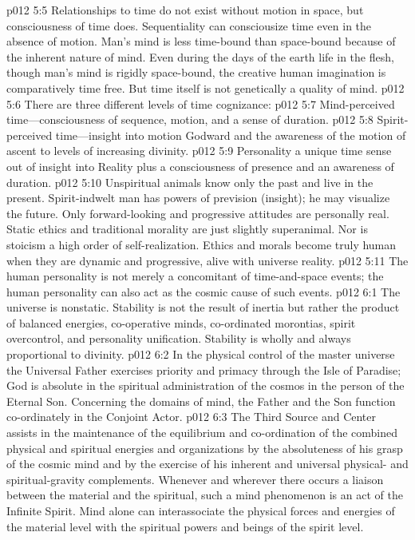 \pc \vs p012 5:5 Relationships to time do not exist without motion in space, but consciousness of time does. Sequentiality can consciousize time even in the absence of motion. Man’s mind is less time\hyp{}bound than space\hyp{}bound because of the inherent nature of mind. Even during the days of the earth life in the flesh, though man’s mind is rigidly space\hyp{}bound, the creative human imagination is comparatively time free. But time itself is not genetically a quality of mind.
\pc \vs p012 5:6 There are three different levels of time cognizance:
\pc \vs p012 5:7 \bibnobreakspace Mind\hyp{}perceived time---consciousness of sequence, motion, and a sense of duration.
\vs p012 5:8 \bibnobreakspace Spirit\hyp{}perceived time---insight into motion Godward and the awareness of the motion of ascent to levels of increasing divinity.
\vs p012 5:9 \bibnobreakspace Personality  a unique time sense out of insight into Reality plus a consciousness of presence and an awareness of duration.
\pc \vs p012 5:10 Unspiritual animals know only the past and live in the present. Spirit\hyp{}indwelt man has powers of prevision (insight); he may visualize the future. Only forward\hyp{}looking and progressive attitudes are personally real. Static ethics and traditional morality are just slightly superanimal. Nor is stoicism a high order of self\hyp{}realization. Ethics and morals become truly human when they are dynamic and progressive, alive with universe reality.
\vs p012 5:11 The human personality is not merely a concomitant of time\hyp{}and\hyp{}space events; the human personality can also act as the cosmic cause of such events.
\vs p012 6:1 The universe is nonstatic. Stability is not the result of inertia but rather the product of balanced energies, co\hyp{}operative minds, co\hyp{}ordinated morontias, spirit overcontrol, and personality unification. Stability is wholly and always proportional to divinity.
\vs p012 6:2 In the physical control of the master universe the Universal Father exercises priority and primacy through the Isle of Paradise; God is absolute in the spiritual administration of the cosmos in the person of the Eternal Son. Concerning the domains of mind, the Father and the Son function co\hyp{}ordinately in the Conjoint Actor.
\vs p012 6:3 The Third Source and Center assists in the maintenance of the equilibrium and co\hyp{}ordination of the combined physical and spiritual energies and organizations by the absoluteness of his grasp of the cosmic mind and by the exercise of his inherent and universal physical\hyp{} and spiritual\hyp{}gravity complements. Whenever and wherever there occurs a liaison between the material and the spiritual, such a mind phenomenon is an act of the Infinite Spirit. Mind alone can interassociate the physical forces and energies of the material level with the spiritual powers and beings of the spirit level.
